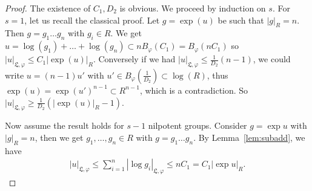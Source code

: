 \documentclass[11pt,leqno]{article}
\theoremstyle{plain}
\theoremstyle{definition}
\theoremstyle{remark}
\numberwithin{equation}{section}
\begin{document}
\begin{proof} The existence of $C_1,D_2$ is obvious. We proceed by induction on $s$. For $s=1$, let us recall the classical proof.
Let $g=\exp(u)$ be such that $|g|_R=n$. Then $g=g_1\dots g_n$ with $g_i \in R$. We get $u=\log(g_1)+\dots+\log(g_n) \subset nB_\varphi(C_1)=B_\varphi(nC_1)$ so $|u|_{\mathfrak{L},\varphi} \le C_1 |\exp(u)|_R$. Conversely if we had $|u|_{\mathfrak{L},\varphi} \le \frac{1}{D_2}(n-1)$, we could write $u=(n-1)u'$ with $u' \in B_\varphi(\frac{1}{D_2}) \subset \log(R)$, thus $\exp(u)=\exp(u')^{n-1} \subset R^{n-1}$, which is a contradiction. So $|u|_{\mathfrak{L},\varphi} \ge \frac{1}{D_2}(|\exp(u)|_R-1)$.

Now assume the result holds for $s-1$ nilpotent groups. 
Consider $g=\exp u$ with $|g|_R=n$, then we get $g_1,\dots,g_n \in R$ with $g=g_1\dots g_n$. By Lemma~\ref{lem:subadd}, we have
\begin{align}\label{eq:upC1}
|u|_{\mathfrak{L},\varphi} \le \sum_{i=1}^n |\log g_i|_{\mathfrak{L},\varphi} \le nC_1= C_1|\exp u|_R.
\end{align}


\end{proof}
\end{document}
